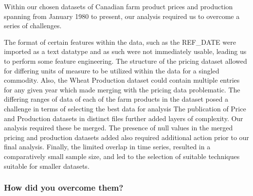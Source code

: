 Within our chosen datasets of Canadian farm product prices and production spanning from January 1980 to present, our analysis required us to overcome a series of challenges.

The format of certain features within the data, such as the REF\_DATE were imported as a text datatype and as such were not immediately usable, leading us to perform some feature engineering.
The structure of the pricing dataset allowed for differing units of measure to be utilized within the data for a singled commodity.
Also, the Wheat Production dataset could contain multiple entries for any given year which made merging with the pricing data problematic.
The differing ranges of data of each of the farm products in the dataset posed a challenge in terms of selecting the best data for analysis
The publication of Price and Production datasets in distinct files further added layers of complexity.
Our analysis required these be merged.
The presence of null values in the merged pricing and production datasets added also required additional action prior to our final analysis.
Finally, the limited overlap in time series, resulted in a comparatively small sample size, and led to the selection of suitable techniques suitable for smaller datasets.

\subsubsection{How did you overcome them?}

